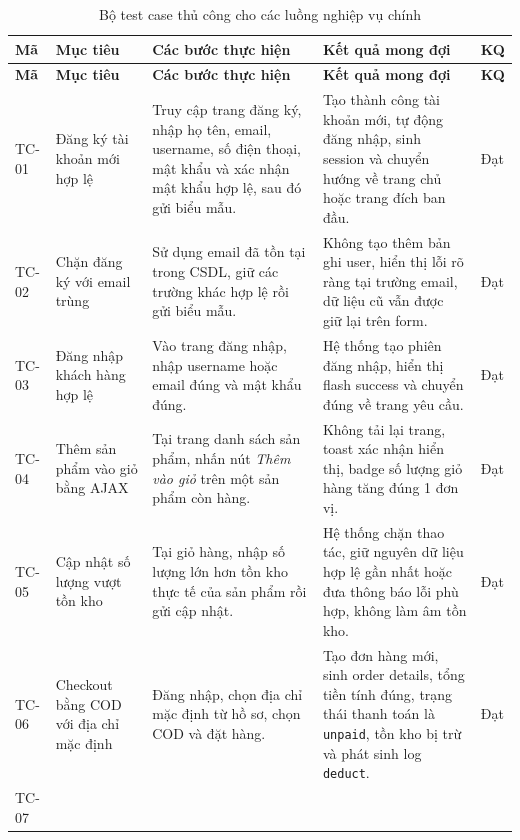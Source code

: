 \documentclass[11pt, a4paper]{article}
\begin{document}
\begingroup
\small
\setlength{\LTpre}{0pt}
\setlength{\LTpost}{0pt}
\begin{longtable}{|p{1.2cm}|p{4.1cm}|p{4.9cm}|p{2.8cm}|p{2cm}|}
    \caption{Bộ test case thủ công cho các luồng nghiệp vụ chính}
    \label{tab:manual-testcases} \\
    \hline
    \textbf{Mã} & \textbf{Mục tiêu} & \textbf{Các bước thực hiện} & \textbf{Kết quả mong đợi} & \textbf{KQ} \\ \hline
    \endfirsthead
    \hline
    \textbf{Mã} & \textbf{Mục tiêu} & \textbf{Các bước thực hiện} & \textbf{Kết quả mong đợi} & \textbf{KQ} \\ \hline
    \endhead
    TC-01 &
    Đăng ký tài khoản mới hợp lệ &
    Truy cập trang đăng ký, nhập họ tên, email, username, số điện thoại,
    mật khẩu và xác nhận mật khẩu hợp lệ, sau đó gửi biểu mẫu. &
    Tạo thành công tài khoản mới, tự động đăng nhập, sinh session và chuyển
    hướng về trang chủ hoặc trang đích ban đầu. &
    Đạt \\ \hline
    TC-02 &
    Chặn đăng ký với email trùng &
    Sử dụng email đã tồn tại trong CSDL, giữ các trường khác hợp lệ rồi gửi biểu mẫu. &
    Không tạo thêm bản ghi user, hiển thị lỗi rõ ràng tại trường email, dữ liệu cũ
    vẫn được giữ lại trên form. &
    Đạt \\ \hline
    TC-03 &
    Đăng nhập khách hàng hợp lệ &
    Vào trang đăng nhập, nhập username hoặc email đúng và mật khẩu đúng. &
    Hệ thống tạo phiên đăng nhập, hiển thị flash success và chuyển đúng về trang yêu cầu. &
    Đạt \\ \hline
    TC-04 &
    Thêm sản phẩm vào giỏ bằng AJAX &
    Tại trang danh sách sản phẩm, nhấn nút \textit{Thêm vào giỏ} trên một sản phẩm còn hàng. &
    Không tải lại trang, toast xác nhận hiển thị, badge số lượng giỏ hàng tăng đúng 1 đơn vị. &
    Đạt \\ \hline
    TC-05 &
    Cập nhật số lượng vượt tồn kho &
    Tại giỏ hàng, nhập số lượng lớn hơn tồn kho thực tế của sản phẩm rồi gửi cập nhật. &
    Hệ thống chặn thao tác, giữ nguyên dữ liệu hợp lệ gần nhất hoặc đưa thông báo lỗi phù hợp,
    không làm âm tồn kho. &
    Đạt \\ \hline
    TC-06 &
    Checkout bằng COD với địa chỉ mặc định &
    Đăng nhập, chọn địa chỉ mặc định từ hồ sơ, chọn COD và đặt hàng. &
    Tạo đơn hàng mới, sinh order details, tổng tiền tính đúng, trạng thái thanh toán là
    \texttt{unpaid}, tồn kho bị trừ và phát sinh log \texttt{deduct}. &
    Đạt \\ \hline
    TC-07 &

\end{longtable}
\end{document}
